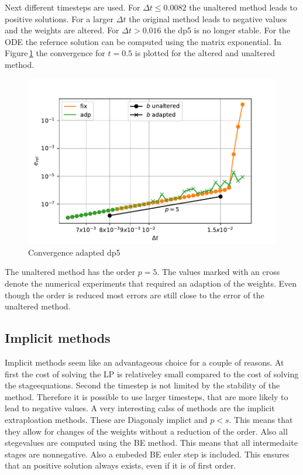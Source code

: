 \documentclass[a4paper]{scrartcl}
\numberwithin{equation}{section}
\theoremstyle{plain}
\theoremstyle{definition}
\numberwithin{theorem}{section}
\newcommand{\dt}{{\Delta t}}
\newcommand{\1}{\mathbbm{1}}
\begin{document}
Next different timesteps are used.
For $\dt \leq 0.0082$ the unaltered method leads to positive solutions. For a larger $\dt$ the original method leads to negative values and the weights are altered. For $\dt >0.016$ the dp5 is no longer stable.
For the ODE the refernce solution can be computed using the matrix exponential. 
In Figure\,\ref{fig:conv_expl} the convergence for $t=0.5$ is plotted for the altered and unaltered method.

\begin{figure}[h]
\centering
\includegraphics[scale=0.75]{plots/conv_adde.pdf}
\caption{Convergence adapted dp5}
\label{fig:conv_expl}
\end{figure}

The unaltered method has the order $p=5$. 
The values marked with an cross denote the numerical experiments that required an adaption of the weights. 
Even though the order is reduced most errors are still close to the error of the unaltered method.

\subsection{Implicit methods}
Implicit methods seem like an advantageous choice for a couple of reasons.
At first the cost of solving the LP is relativeley small compared to the cost of solving the stageequations.
Second the timestep is not limited by the stability of the method.
Therefore it is possible to use larger timesteps, that are more likely to lead to negative values.
A very interesting calss of methods are the implicit extraploation methods. These are Diagonaly implict and $p < s$. This means that they allow for changes of the weights without a reduction of the order.
Also all stegevalues are computed using the BE method. This means that all intermedaite stages are nonnegative. 
Also a embeded BE euler step is included. This ensures that an positive solution always exists, even if it is of first order. 
\end{document}
